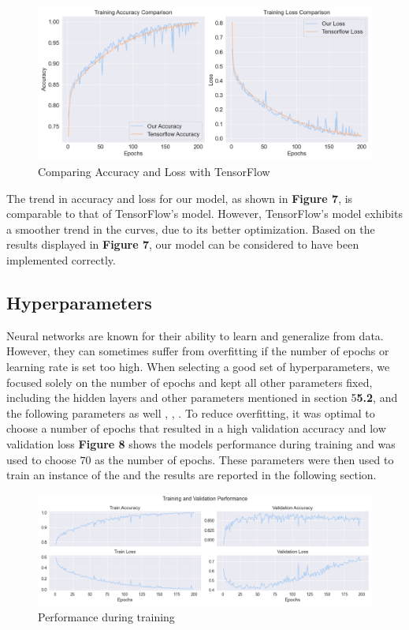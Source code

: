 \begin{figure}[H]
    \centering
    \includegraphics[scale=0.45]{figures_for_report/tensorflow_vs_our}
    \captionsetup{justification=centering,margin=2cm}
    \caption{Comparing Accuracy and Loss with TensorFlow}
\end{figure}

The trend in accuracy and loss for our model, as shown in \textbf{Figure 7}, is comparable to that of TensorFlow's model.
However, TensorFlow's model exhibits a smoother trend in the curves, due to its better optimization.
Based on the results displayed in \textbf{Figure 7}, our model can be considered to have been implemented correctly.

\subsection{Hyperparameters}
Neural networks are known for their ability to learn and generalize from data.
However, they can sometimes suffer from overfitting if the number of epochs or learning rate is set too high.
When selecting a good set of hyperparameters, we focused solely on the number of epochs and kept all other parameters fixed, including the hidden layers and other parameters mentioned in section 5\textbf{5.2}, and the following parameters as well , , .
To reduce overfitting, it was optimal to choose a number of epochs that resulted in a high validation accuracy and low validation loss
\textbf{Figure 8} shows the models performance during training and was used to choose $70$ as the number of epochs.
These parameters were then used to train an instance of the  and the results are reported in the following section.
\begin{figure}[H]
    \centering
    \includegraphics[scale=0.45]{figures_for_report/train_validation_nn_performance}
    \captionsetup{justification=centering,margin=2cm}
    \caption{Performance during training}\label{fig:figure}
\end{figure}

